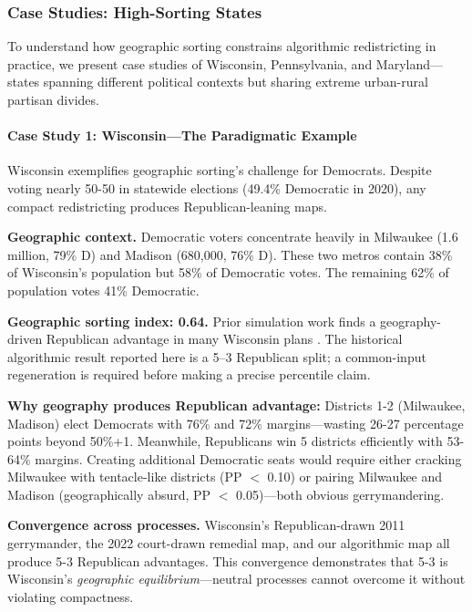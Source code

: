 
\subsubsection{Case Studies: High-Sorting States}
\label{sec:case_studies}

To understand how geographic sorting constrains algorithmic redistricting in practice, we present case studies of Wisconsin, Pennsylvania, and Maryland---states spanning different political contexts but sharing extreme urban-rural partisan divides.

\paragraph{Case Study 1: Wisconsin---The Paradigmatic Example}

Wisconsin exemplifies geographic sorting's challenge for Democrats. Despite voting nearly 50-50 in statewide elections (49.4\% Democratic in 2020), any compact redistricting produces Republican-leaning maps.

\textbf{Geographic context.} Democratic voters concentrate heavily in Milwaukee (1.6 million, 79\% D) and Madison (680,000, 76\% D). These two metros contain 38\% of Wisconsin's population but 58\% of Democratic votes. The remaining 62\% of population votes 41\% Democratic.

\textbf{Geographic sorting index: 0.64.} Prior simulation work finds a geography-driven Republican advantage in many Wisconsin plans \citep{chen2017impact}. The historical algorithmic result reported here is a 5--3 Republican split; a common-input regeneration is required before making a precise percentile claim.

\textbf{Why geography produces Republican advantage:} Districts 1-2 (Milwaukee, Madison) elect Democrats with 76\% and 72\% margins---wasting 26-27 percentage points beyond 50\%+1. Meanwhile, Republicans win 5 districts efficiently with 53-64\% margins. Creating additional Democratic seats would require either cracking Milwaukee with tentacle-like districts (PP $<$ 0.10) or pairing Milwaukee and Madison (geographically absurd, PP $<$ 0.05)---both obvious gerrymandering.

\textbf{Convergence across processes.} Wisconsin's Republican-drawn 2011 gerrymander, the 2022 court-drawn remedial map, and our algorithmic map all produce 5-3 Republican advantages. This convergence demonstrates that 5-3 is Wisconsin's \textit{geographic equilibrium}---neutral processes cannot overcome it without violating compactness.

